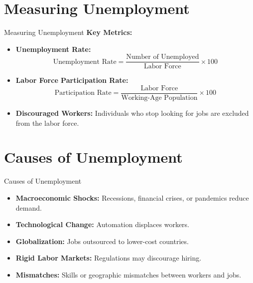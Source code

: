 \documentclass{beamer}
\begin{document}
\section{Measuring Unemployment}
\begin{frame}{Measuring Unemployment}
    \textbf{Key Metrics:}
    \begin{itemize}
        \item \textbf{Unemployment Rate:}
        \[
        \text{Unemployment Rate} = \frac{\text{Number of Unemployed}}{\text{Labor Force}} \times 100
        \]
        \item \textbf{Labor Force Participation Rate:}
        \[
        \text{Participation Rate} = \frac{\text{Labor Force}}{\text{Working-Age Population}} \times 100
        \]
        \item \textbf{Discouraged Workers:} Individuals who stop looking for jobs are excluded from the labor force.
    \end{itemize}
\end{frame}

\section{Causes of Unemployment}
\begin{frame}{Causes of Unemployment}
    \begin{itemize}
        \item \textbf{Macroeconomic Shocks:} Recessions, financial crises, or pandemics reduce demand.
        \item \textbf{Technological Change:} Automation displaces workers.
        \item \textbf{Globalization:} Jobs outsourced to lower-cost countries.
        \item \textbf{Rigid Labor Markets:} Regulations may discourage hiring.
        \item \textbf{Mismatches:} Skills or geographic mismatches between workers and jobs.
    \end{itemize}
\end{frame}

\end{document}
